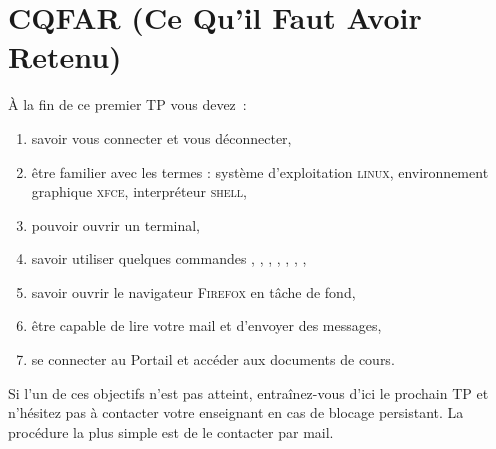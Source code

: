 \documentclass[a4paper,11pt]{article}
\newcommand{\netscape}{\textsc{Firefox}\xspace}
\newcommand{\linux}{\textsc{linux}\xspace}
\newcommand{\gnome}{\textsc{xfce}\xspace}
\newcommand{\shell}{\textsc{shell}\xspace}
\begin{document}
\section{CQFAR (Ce Qu'il Faut Avoir Retenu)}

À la fin de ce premier TP vous devez~:

\begin{enumerate}
  \item savoir vous connecter et vous déconnecter,
  \item être familier avec les termes : système d'exploitation \linux,
        environnement graphique \gnome, interpréteur \shell,
  \item pouvoir ouvrir un terminal,
  \item savoir utiliser quelques commandes , , ,
        , , , ,
  \item savoir ouvrir le navigateur \netscape en tâche de fond,
  \item être capable de lire votre mail et d'envoyer des messages,
  \item se connecter au Portail et accéder aux documents de cours.
\end{enumerate}

Si l'un de ces objectifs n'est pas atteint, entraînez-vous d'ici le prochain
TP et n'hésitez pas à contacter votre enseignant en cas de blocage
persistant. La procédure la plus simple est de le contacter par mail.

\end{document}
